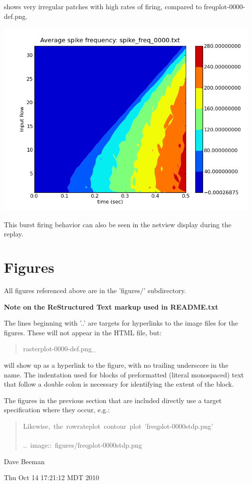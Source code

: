 \documentclass[10pt,a4paper,english]{article}
\begin{document}
shows very irregular patches with high rates of firing, compared to
freqplot-0000-def.png.

\includegraphics{figures/freqplot-0000-def.png}

This burst firing behavior can also be seen in the netview display during
the replay.



\hypertarget{figures}{}
\section*{Figures}
\label{figures}

All figures referenced above are in the 'figures/' subdirectory.

\textbf{Note on the ReStructured Text markup used in README.txt}

The lines beginning with '..' are targets for hyperlinks to the image
files for the figures.  These will not appear in the HTML file, but:
\begin{quote}{\ttfamily \raggedright \noindent
rasterplot-0000-def.png{\_}
}\end{quote}

will show up as a hyperlink to the figure, with no trailing underscore in
the name.  The indentation used for blocks of preformatted (literal
monospaced) text that follow a double colon is necessary for identifying
the extent of the block.

The figures in the previous section that are included directly use
a target specification where they occur, e.g.:
\begin{quote}{\ttfamily \raggedright \noindent
Likewise,~the~rowrateplot~contour~plot~'freqplot-0000stdp.png'~\\
~\\
..~image::~figures/freqplot-0000stdp.png
}\end{quote}

Dave Beeman

Thu Oct 14 17:21:12 MDT 2010
\end{document}
